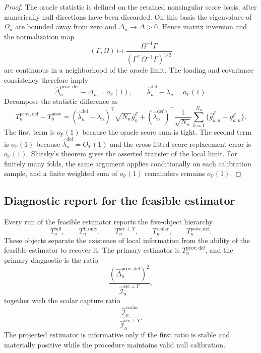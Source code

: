 \documentclass[11pt,a4paper]{amsart}
\theoremstyle{plain}
\theoremstyle{definition}
\theoremstyle{remark}
\newcommand{\PP}{\mathbb{P}}
\newcommand{\scrI}{\mathcal{I}}
\begin{document}
\begin{proof}
The oracle statistic is defined on the retained nonsingular score basis, after numerically null
directions have been discarded.  On this basis the eigenvalues of \(\Omega_n\) are bounded away
from zero and \(\Delta_n\to\Delta>0\).  Hence matrix inversion and the normalization map
\[
        (\Gamma,\Omega)
        \mapsto
        \frac{\Omega^{-1}\Gamma}
        {(\Gamma^\top\Omega^{-1}\Gamma)^{1/2}}
\]
are continuous in a neighborhood of the oracle limit.  The loading and covariance consistency
therefore imply
\[
        \widehat\Delta_n^{\mathrm{pcov,def}}-\Delta_n=o_{\PP}(1),
        \qquad
        \widehat\lambda_n^{\mathrm{def}}-\lambda_n=o_{\PP}(1).
\]
Decompose the statistic difference as
\[
        T_n^{\mathrm{pcov,def}}-T_n^{\mathrm{pcov}}
        =
        (\widehat\lambda_n^{\mathrm{def}}-\lambda_n)^\top
        \sqrt{N_n}\bar g_n^{\mathcal E}
        +
        (\widehat\lambda_n^{\mathrm{def}})^\top
        \frac1{\sqrt{N_n}}\sum_{k=1}^{N_n}
        \{\widehat g_{k,n}^{\mathcal E}-g_{k,n}^{\mathcal E}\}.
\]
The first term is \(o_{\PP}(1)\) because the oracle score sum is tight.  The second term is
\(o_{\PP}(1)\) because \(\widehat\lambda_n^{\mathrm{def}}=O_{\PP}(1)\) and the cross-fitted score
replacement error is \(o_{\PP}(1)\).  Slutsky's theorem gives the asserted transfer of the local
limit.  For finitely many folds, the same argument applies conditionally on each calibration sample,
and a finite weighted sum of \(o_{\PP}(1)\) remainders remains \(o_{\PP}(1)\).
\end{proof}

\subsection{Diagnostic report for the feasible estimator}

Every run of the feasible estimator reports the five-object hierarchy
\[
        T_n^{\mathrm{full}},
        \qquad
        T_n^{Y,\mathrm{only}},
        \qquad
        T_n^{\mathrm{src}\perp Y},
        \qquad
        T_n^{\mathrm{scalar}},
        \qquad
        T_n^{\mathrm{pcov,def}}.
\]
These objects separate the existence of local information from the ability of the feasible
estimator to recover it.  The primary estimator is
\(T_n^{\mathrm{pcov,def}}\), and the primary diagnostic is the ratio
\[
        \frac{(\widehat\Delta_n^{\mathrm{pcov,def}})^2}
        {\widehat{\scrI}_n^{\mathrm{src}\perp Y}},
\]
together with the scalar capture ratio
\[
        \frac{\widehat{\scrI}_n^{\mathrm{scalar}}}
        {\widehat{\scrI}_n^{\mathrm{src}\perp Y}}.
\]
The projected estimator is informative only if the first ratio is stable and materially positive
while the procedure maintains valid null calibration.
\end{document}
